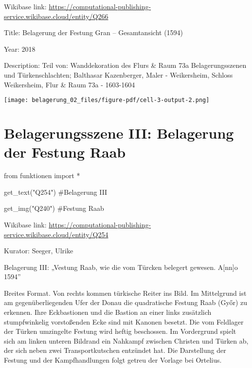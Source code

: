 \documentclass[
  a4paper,
  portrait]{book}
\newenvironment{Shaded}{\begin{snugshade}}{\end{snugshade}}
\newcommand{\CommentTok}[1]{\textcolor[rgb]{0.37,0.37,0.37}{#1}}
\newcommand{\ImportTok}[1]{\textcolor[rgb]{0.00,0.46,0.62}{#1}}
\newcommand{\NormalTok}[1]{\textcolor[rgb]{0.00,0.23,0.31}{#1}}
\newcommand{\OperatorTok}[1]{\textcolor[rgb]{0.37,0.37,0.37}{#1}}
\newcommand{\StringTok}[1]{\textcolor[rgb]{0.13,0.47,0.30}{#1}}
\begin{document}
Wikibase link:
\url{https://computational-publishing-service.wikibase.cloud/entity/Q266}

Title: Belagerung der Festung Gran -- Gesamtansicht (1594)

Year: 2018

Description: Teil von: Wanddekoration des Flurs \& Raum 73a
Belagerungsszenen und Türkenschlachten; Balthasar Kazenberger, Maler -
Weikersheim, Schloss Weikersheim, Flur \& Raum 73a - 1603-1604

\texttt{[image: belagerung\_02\_files/figure-pdf/cell-3-output-2.png]}

\chapter{Belagerungsszene III: Belagerung der Festung
Raab}\label{belagerungsszene-iii-belagerung-der-festung-raab}

\begin{Shaded}
\begin{Highlighting}[]
\ImportTok{from}\NormalTok{ funktionen }\ImportTok{import} \OperatorTok{*}
\end{Highlighting}
\end{Shaded}

\begin{Shaded}
\begin{Highlighting}[]
\NormalTok{get\_text(}\StringTok{"Q254"}\NormalTok{)}
\CommentTok{\#Belagerung III}

\NormalTok{get\_img(}\StringTok{"Q240"}\NormalTok{)}
\CommentTok{\#Festung Raab}
\end{Highlighting}
\end{Shaded}

Wikibase link:
\url{https://computational-publishing-service.wikibase.cloud/entity/Q254}

Kurator: Seeger, Ulrike

Belagerung III: „Vestung Raab, wie die vom Türcken belegert gewesen.
A{[}nn{]}o 1594''

Breites Format. Von rechts kommen türkische Reiter ins Bild. Im
Mittelgrund ist am gegenüberliegenden Ufer der Donau die quadratische
Festung Raab (Győr) zu erkennen. Ihre Eckbastionen und die Bastion an
einer links zusätzlich stumpfwinkelig vorstoßenden Ecke sind mit Kanonen
besetzt. Die vom Feldlager der Türken umzingelte Festung wird heftig
beschossen. Im Vordergrund spielt sich am linken unteren Bildrand ein
Nahkampf zwischen Christen und Türken ab, der sich neben zwei
Transportkutschen entzündet hat. Die Darstellung der Festung und der
Kampfhandlungen folgt getreu der Vorlage bei Ortelius.
\end{document}
